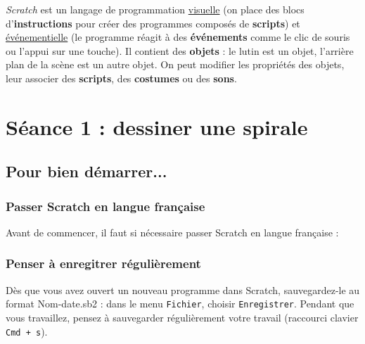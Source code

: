 \emph{Scratch} est un langage de programmation \underline{visuelle} (on place des blocs d'\textbf{instructions} pour créer des programmes composés de \textbf{scripts}) et \underline{événementielle} (le programme réagit à des \textbf{événements} comme le clic de souris ou l'appui sur une touche). Il contient des \textbf{objets} : le lutin est un objet, l'arrière plan de la scène est un autre objet. On peut modifier les propriétés des objets, leur associer des \textbf{scripts}, des \textbf{costumes} ou des \textbf{sons}.   




















%
%
%
%



\section{Séance 1 : dessiner une spirale}\label{ficheScratch5e1}

\subsection{Pour bien démarrer...}

\subsubsection{Passer Scratch en langue française} 

Avant de commencer, il faut si nécessaire passer Scratch en langue française :




\subsubsection{Penser à enregitrer régulièrement}

Dès que vous avez ouvert un nouveau programme dans Scratch, sauvegardez-le au format Nom-date.sb2 : dans le menu \texttt{Fichier}, choisir \texttt{Enregistrer}. Pendant que vous travaillez, pensez à sauvegarder régulièrement votre travail (raccourci clavier \texttt{Cmd + s}).   

